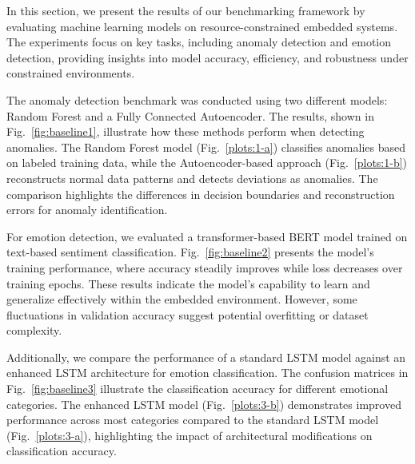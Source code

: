 \documentclass[conference]{IEEEtran}
\begin{document}
In this section, we present the results of our benchmarking framework by evaluating machine learning models on resource-constrained embedded systems. The experiments focus on key tasks, including anomaly detection and emotion detection, providing insights into model accuracy, efficiency, and robustness under constrained environments.

The anomaly detection benchmark was conducted using two different models: Random Forest and a Fully Connected Autoencoder. The results, shown in Fig.~\ref{fig:baseline1}, illustrate how these methods perform when detecting anomalies. The Random Forest model (Fig.~\ref{plots:1-a}) classifies anomalies based on labeled training data, while the Autoencoder-based approach (Fig.~\ref{plots:1-b}) reconstructs normal data patterns and detects deviations as anomalies. The comparison highlights the differences in decision boundaries and reconstruction errors for anomaly identification.

For emotion detection, we evaluated a transformer-based BERT model trained on text-based sentiment classification. Fig.~\ref{fig:baseline2} presents the model's training performance, where accuracy steadily improves while loss decreases over training epochs. These results indicate the model's capability to learn and generalize effectively within the embedded environment. However, some fluctuations in validation accuracy suggest potential overfitting or dataset complexity.

Additionally, we compare the performance of a standard LSTM model against an enhanced LSTM architecture for emotion classification. The confusion matrices in Fig.~\ref{fig:baseline3} illustrate the classification accuracy for different emotional categories. The enhanced LSTM model (Fig.~\ref{plots:3-b}) demonstrates improved performance across most categories compared to the standard LSTM model (Fig.~\ref{plots:3-a}), highlighting the impact of architectural modifications on classification accuracy.
\end{document}
